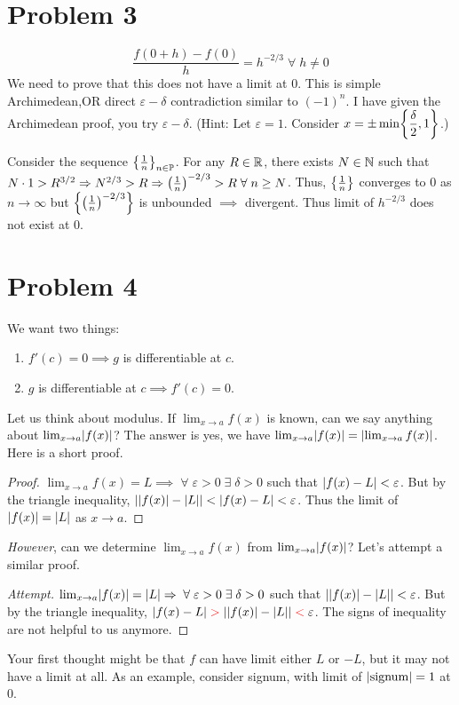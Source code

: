 \documentclass[12pt]{article}
\begin{document}
\section*{Problem 3}
\[
    \frac{f(0 + h) - f(0)}{h} = h^{-2/3} \;\forall\; h \neq 0
\]
We need to prove that this does not have a limit at 0. This is simple Archimedean,OR direct $\varepsilon-\delta$ contradiction similar to $(-1)^{n}$. I have given the Archimedean proof, you try $\varepsilon-\delta$. (Hint: Let $\varepsilon = 1$. Consider $x = \pm\min \set{\dfrac{\delta}{2}, 1}$.)

Consider the sequence $\set{\frac{1}{n}}_{n \in \P}$.
For any $R \in \mathbb{R}$, there exists $N \in \mathbb{N}$ such that $N \cdot 1 > R^{3/2} \implies N^{2/3} > R \implies \paren{\frac{1}{n}}^{-2/3} > R \;\forall\; n \geq N$.
Thus, $\set{\frac{1}{n}}$ converges to 0 as $n \to \infty$ but $\set{\paren{\frac{1}{n}}^{-2/3}}$ is unbounded $\implies$ divergent.
Thus limit of $h^{-2/3}$ does not exist at 0.

\section*{Problem 4}
We want two things:
\begin{enumerate}[label=(\roman*)]
    \item $f'(c) = 0 \implies g$ is differentiable at $c$.
    \item $g$ is differentiable at $c \implies f'(c) = 0$.
\end{enumerate}
Let us think about modulus. If $\lim_{x \to a} f(x)$ is known, can we say anything about $\lim_{x \to a} \abs{f(x)}$? The answer is yes, we have $\lim_{x \to a} \abs{f(x)} = \abs{\lim_{x \to a} f(x)}$. Here is a short proof.
\begin{proof}
    $\lim_{x \to a} f(x) = L \implies \;\forall\; \varepsilon > 0 \;\exists\; \delta > 0$ such that $\abs{f(x) - L} < \varepsilon$. But by the triangle inequality, $\abs{\abs{f(x)} - \abs{L}} < \abs{f(x) - L} < \varepsilon$. Thus the limit of $\abs{f(x)} = \abs{L}$ as $x \to a$.
\end{proof}

\emph{However}, can we determine $\lim_{x \to a} f(x)$ from $\lim_{x \to a} \abs{f(x)}$? Let's attempt a similar proof.
\begin{proof}[Attempt]
    $\lim_{x \to a} \abs{f(x)} = \abs{L} \implies \;\forall\; \varepsilon > 0 \;\exists\; \delta > 0$ such that $\abs{\abs{f(x)} - \abs{L}} < \varepsilon$.
    But by the triangle inequality, $\abs{f(x) - L} \;\textcolor{red}{>}\; \abs{\abs{f(x)} - \abs{L}} \;\textcolor{red}{<}\; \varepsilon$.
    The signs of inequality are not helpful to us anymore.
\end{proof}
Your first thought might be that $f$ can have limit either $L$ or $-L$, but it may not have a limit at all. As an example, consider signum, with limit of $\abs{\mathrm{signum}} = 1$ at 0.
\end{document}
